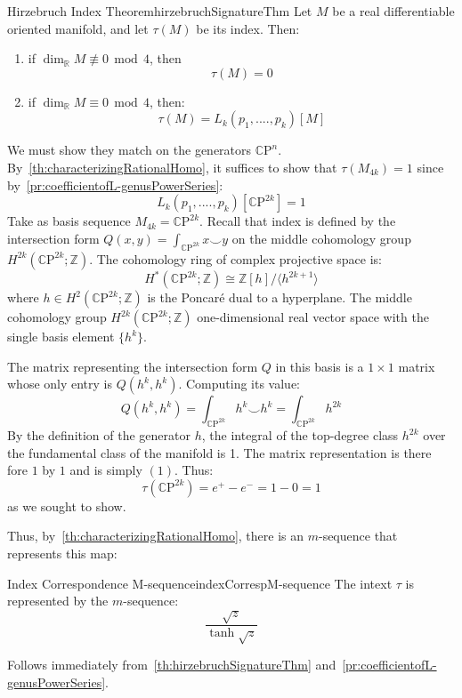 \documentclass{book}
\newenvironment{Proof}[1][]
  {\begin{ProofTcb}[#1]}
  {\end{ProofTcb}}
\newcommand{\R}{{\mathbb{R}}}
\newcommand{\Z}{{\mathbb{Z}}}
\newcommand{\CP}{{\mathbb{C}\mathrm{P}}}
\renewcommand{\mod}{\,\operatorname{mod}\,}
\begin{document}
\begin{thm}{Hirzebruch Index Theorem}{hirzebruchSignatureThm}
  Let $M$ be a real differentiable oriented manifold, and let $\tau(M)$ be its index. Then:
  \begin{enumerate}
    \item if $\dim_\R M\not\equiv 0\mod 4$, then
      \[
        \tau(M) = 0
      \]
    \item if $\dim_\R M\equiv 0\mod 4$, then:
      \[
        \tau(M) = L_k(p_1, ...., p_k)[M]
      \]
  \end{enumerate}
\end{thm}

\begin{Proof}
  We must show they match on the generators $\CP^n$. By~\cref{th:characterizingRationalHomo}, it suffices to
  show that $\tau(M_{4k}) = 1$ since by~\cref{pr:coefficientofL-genusPowerSeries}:
  \[
    L_k(p_1, ...., p_k)[\CP^{2k}] = 1
  \]
  Take as basis sequence $M_{4k}=\CP^{2k}$. Recall that index is defined by the
  intersection form $Q(x,y) = \int_{{\CP}^{2k}} x \smile y$ on the middle cohomology group
  $H^{2k}({\CP}^{2k}; {\Z})$. The cohomology ring of complex projective space is:
  \[
  H^*({\CP}^{2k}; {\Z}) \cong {\Z}[h] / \langle h^{2k+1} \rangle
  \]
  where $h \in H^2({\CP}^{2k}; {\Z})$ is the Poncar\'e dual to a hyperplane. The middle cohomology group $H^{2k}({\CP}^{2k}; {\Z})$ one-dimensional real vector space with the single basis element $\{h^k\}$.

The matrix representing the intersection form $Q$ in this basis is a $1 \times 1$ matrix whose only entry is
$Q(h^k, h^k)$. Computing its value:
\[
Q(h^k, h^k) = \int_{{\CP}^{2k}} h^k \smile h^k = \int_{{\CP}^{2k}} h^{2k}
\]
By the definition of the generator $h$, the integral of the top-degree class $h^{2k}$ over the fundamental
class of the manifold is 1. The matrix representation is there fore $1$ by $1$ and is simply $(1)$. Thus:
\[
  \tau({\CP}^{2k}) = e^+ - e^- = 1 - 0 = 1
  \]
as we sought to show.
\end{Proof}

Thus, by~\cref{th:characterizingRationalHomo}, there is an $m$-sequence that represents this map:
\begin{thm}{Index Correspondence M-sequence}{indexCorrespM-sequence}
  The intext $\tau$ is represented by the $m$-sequence:
  \[
    \frac{\sqrt{z}}{\tanh{\sqrt{z}}}
  \]
\end{thm}

\begin{Proof}
  Follows immediately from~\cref{th:hirzebruchSignatureThm} and~\cref{pr:coefficientofL-genusPowerSeries}.
\end{Proof}
\end{document}
